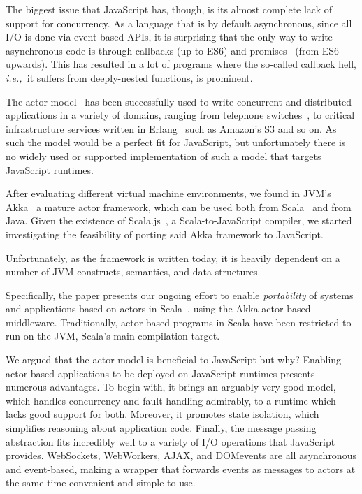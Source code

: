 \documentclass{sig-alternate}
\newcommand{\ie}{{\em i.e.,~}}
\begin{document}
The biggest issue that JavaScript has, though, is its almost complete lack of support for concurrency. As a language that is by default asynchronous, since all I/O is done via event-based APIs, it is surprising that the only way to write asynchronous code is through callbacks (up to ES6) and promises~\cite{LiskovS88} (from ES6 upwards). This has resulted in a lot of programs where the so-called callback hell, \ie it suffers from deeply-nested functions, is prominent.

The actor model~\cite{Hewitt77,Agha} has been successfully used to write concurrent and distributed applications in a variety of domains, ranging from telephone switches~\cite{ErlangApplications}, to critical infrastructure services written in Erlang~\cite{Armstrong10} such as Amazon's S3 and so on. As such the model would be a perfect fit for JavaScript, but unfortunately there is no widely used or supported implementation of such a model that targets JavaScript runtimes.

After evaluating different virtual machine environments, we found in JVM\rq{s}\cite{Lindholm-Yellin} Akka~\cite{Akka} a mature actor framework, which can be used both from Scala~\cite{OderskyR14} and from Java. Given the existence of Scala.js~\cite{Scalajs}, a Scala-to-JavaScript compiler, we started investigating the feasibility of porting said Akka framework to JavaScript.

Unfortunately, as the framework is written today, it is heavily dependent on a number of JVM constructs, semantics, and data structures. %

Specifically, the paper presents our ongoing effort to enable {\em portability} of systems and applications based on actors in Scala~\cite{ActorsInScala}, using the Akka actor-based middleware. Traditionally, actor-based programs in Scala have been restricted to run on the JVM, Scala's main compilation target. %

We argued that the actor model is beneficial to JavaScript but why? Enabling actor-based applications to be deployed on JavaScript runtimes presents numerous advantages. To begin with, it brings an arguably very good model, which handles concurrency and fault handling admirably, to a runtime which lacks good support for both. Moreover, it promotes state isolation, which simplifies reasoning about application code. Finally, the message passing abstraction fits incredibly well to a variety of I/O operations that JavaScript provides. WebSockets, WebWorkers, AJAX, and DOM\newline events are all asynchronous and event-based, making a wrapper that forwards events as messages to actors at the same time convenient and simple to use.
\end{document}
